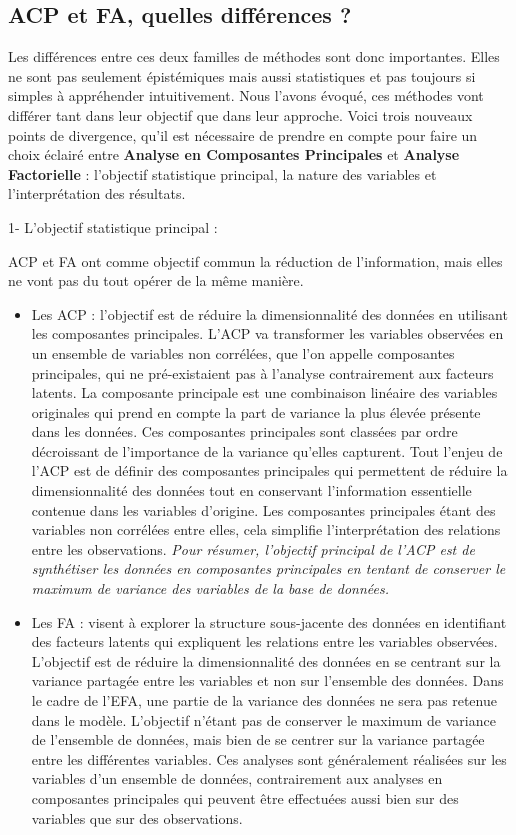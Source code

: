 \documentclass[
  french,
  11pt,
  a4paper,
]{article}
\providecommand{\tightlist}{%
  \setlength{\itemsep}{0pt}\setlength{\parskip}{0pt}}
\begin{document}
\subsection{ACP et FA, quelles différences
?}\label{acp-et-fa-quelles-diffuxe9rences}

Les différences entre ces deux familles de méthodes sont donc
importantes. Elles ne sont pas seulement épistémiques mais aussi
statistiques et pas toujours si simples à appréhender intuitivement.
Nous l'avons évoqué, ces méthodes vont différer tant dans leur objectif
que dans leur approche. Voici trois nouveaux points de divergence, qu'il
est nécessaire de prendre en compte pour faire un choix éclairé entre
\textbf{Analyse en Composantes Principales} et \textbf{Analyse
Factorielle} : l'objectif statistique principal, la nature des variables
et l'interprétation des résultats.

1- L'objectif statistique principal :

ACP et FA ont comme objectif commun la réduction de l'information, mais
elles ne vont pas du tout opérer de la même manière.

\begin{itemize}
\tightlist
\item
  Les ACP : l'objectif est de réduire la dimensionnalité des données en
  utilisant les composantes principales. L'ACP va transformer les
  variables observées en un ensemble de variables non corrélées, que
  l'on appelle composantes principales, qui ne pré-existaient pas à
  l'analyse contrairement aux facteurs latents. La composante principale
  est une combinaison linéaire des variables originales qui prend en
  compte la part de variance la plus élevée présente dans les données.
  Ces composantes principales sont classées par ordre décroissant de
  l'importance de la variance qu'elles capturent. Tout l'enjeu de l'ACP
  est de définir des composantes principales qui permettent de réduire
  la dimensionnalité des données tout en conservant l'information
  essentielle contenue dans les variables d'origine. Les composantes
  principales étant des variables non corrélées entre elles, cela
  simplifie l'interprétation des relations entre les observations.
  \emph{Pour résumer, l'objectif principal de l'ACP est de synthétiser
  les données en composantes principales en tentant de conserver le
  maximum de variance des variables de la base de données.}
\item
  Les FA : visent à explorer la structure sous-jacente des données en
  identifiant des facteurs latents qui expliquent les relations entre
  les variables observées. L'objectif est de réduire la dimensionnalité
  des données en se centrant sur la variance partagée entre les
  variables et non sur l'ensemble des données. Dans le cadre de l'EFA,
  une partie de la variance des données ne sera pas retenue dans le
  modèle. L'objectif n'étant pas de conserver le maximum de variance de
  l'ensemble de données, mais bien de se centrer sur la variance
  partagée entre les différentes variables. Ces analyses sont
  généralement réalisées sur les variables d'un ensemble de données,
  contrairement aux analyses en composantes principales qui peuvent être
  effectuées aussi bien sur des variables que sur des observations.
\end{itemize}
\end{document}
